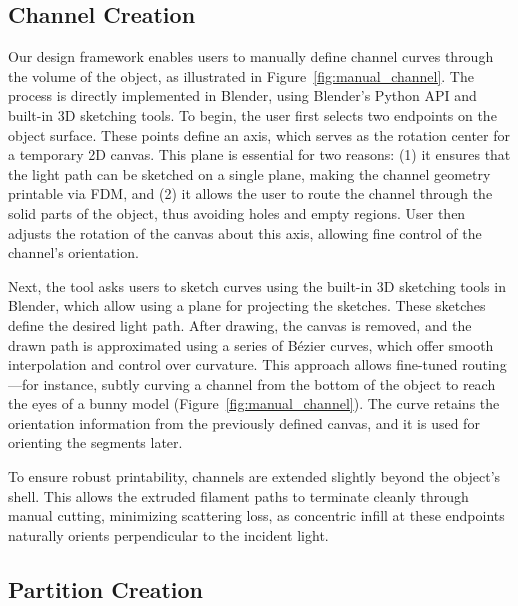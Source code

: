 \subsection{Channel Creation} 
Our design framework enables users to manually define channel curves through the volume of the object, as illustrated in Figure~\ref{fig:manual_channel}. The process is directly implemented in Blender, using Blender's Python API and built-in 3D sketching tools. To begin, the user first selects two endpoints on the object surface. These points define an axis, which serves as the rotation center for a temporary 2D canvas. This plane is essential for two reasons: (1) it ensures that the light path can be sketched on a single plane, making the channel geometry printable via FDM, and (2) it allows the user to route the channel through the solid parts of the object, thus avoiding holes and empty regions. User then adjusts the rotation of the canvas about this axis, allowing fine control of the channel’s orientation. 

Next, the tool asks users to sketch curves using the built-in 3D sketching tools in Blender, which allow using a plane for projecting the sketches. These sketches define the desired light path. After drawing, the canvas is removed, and the drawn path is approximated using a series of Bézier curves, which offer smooth interpolation and control over curvature. This approach allows fine-tuned routing---for instance, subtly curving a channel from the bottom of the object to reach the eyes of a bunny model (Figure~\ref{fig:manual_channel}). The curve retains the orientation information from the previously defined canvas, and it is used for orienting the segments later.

To ensure robust printability, channels are extended slightly beyond the object’s shell. This allows the extruded filament paths to terminate cleanly through manual cutting, minimizing scattering loss, as concentric infill at these endpoints naturally orients perpendicular to the incident light.

    

\subsection{Partition Creation} 

